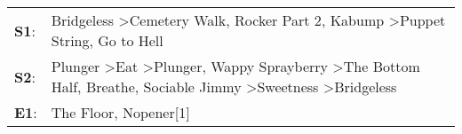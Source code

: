 \begin{supertabular}{p{0.03\textwidth}p{0.92\textwidth}}
 \textbf{S1}:  &                                                                                                                                                    Bridgeless\textsuperscript{} \textgreater \enspace Cemetery Walk\textsuperscript{}, \enspace Rocker Part 2\textsuperscript{}, \enspace Kabump\textsuperscript{} \textgreater \enspace Puppet String\textsuperscript{}, \enspace Go to Hell\textsuperscript{}  \enspace  \\
 \textbf{S2}:  &  Plunger\textsuperscript{} \textgreater \enspace Eat\textsuperscript{} \textgreater \enspace Plunger\textsuperscript{}, \enspace Wappy Sprayberry\textsuperscript{} \textgreater \enspace The Bottom Half\textsuperscript{}, \enspace Breathe\textsuperscript{}, \enspace Sociable Jimmy\textsuperscript{} \textgreater \enspace Sweetness\textsuperscript{} \textgreater \enspace Bridgeless\textsuperscript{}  \enspace  \\
 \textbf{E1}:  &                                                                                                                                                                                                                                                                                                                                              The Floor\textsuperscript{}, \enspace Nopener[1]\textsuperscript{}  \enspace  \\
\end{supertabular}
